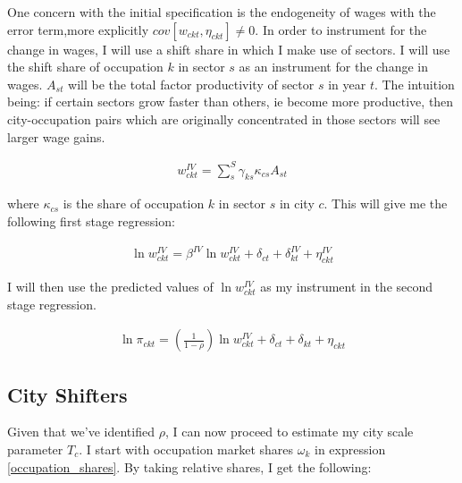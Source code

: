 \documentclass[10pt]{article}
\begin{document}

One concern with the initial specification is the endogeneity of wages with the error term,more explicitly $cov[w_{ckt}, \eta_{ckt}] \neq 0$. In order to instrument for the change in wages, I will use a shift share in which I make use of sectors. I will use the shift share of occupation $k$ in sector $s$ as an instrument for the change in wages. $A_{st}$ will be the total factor productivity of sector $s$ in year $t$. The intuition being: if certain sectors grow faster than others, ie become more productive, then city-occupation pairs which are originally concentrated in those sectors will see larger wage gains.


\begin{align*}
    w_{ckt}^{IV} = \sum_{s}^{S} \gamma_{ks} \kappa_{cs} A_{st}
\end{align*}

where $\kappa_{cs}$ is the  share of occupation $k$ in sector $s$ in city $c$. This will give me the following first stage regression:

\begin{align*}
    \ln w_{ckt}^{IV} = \beta^{IV} \ln w_{ckt}^{IV} + \delta_{ct} + \delta_{kt}^{IV} + \eta_{ckt}^{IV}
\end{align*}

I will then use the predicted values of $\ln w_{ckt}^{IV}$ as my instrument in the second stage regression.

\begin{align*}
    \ln \pi_{ckt} = \left( \frac{1}{1 - \rho} \right) \ln w_{ckt}^{IV} + \delta_{ct} + \delta_{kt} + \eta_{ckt}
\end{align*}

\subsection{City Shifters}

Given that we've identified $\rho$, I can now proceed to estimate my city scale parameter $T_c$. I start with occupation market shares $\omega_k$ in expression \ref{occupation_shares}. By taking relative shares, I get the following:
\end{document}
